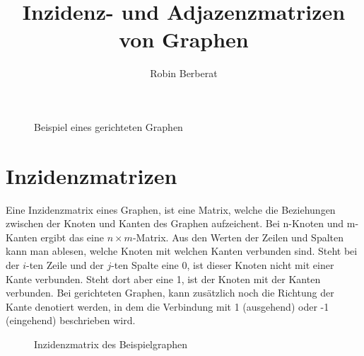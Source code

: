 \documentclass{article}
\begin{document}
    \title{Inzidenz- und Adjazenzmatrizen von Graphen}
    \author{Robin Berberat}
    \maketitle

    \begin{figure}[h]
        \centering
        \caption{Beispiel eines gerichteten Graphen}
    \end{figure}

    \newpage

    \section{Inzidenzmatrizen}
    Eine Inzidenzmatrix eines Graphen, ist eine Matrix, welche die Beziehungen zwischen der Knoten und Kanten des Graphen aufzeichent.
    Bei n-Knoten und m-Kanten ergibt das eine \(n\times m\)-Matrix.
    Aus den Werten der Zeilen und Spalten kann man ablesen, welche Knoten mit welchen Kanten verbunden sind.
    Steht bei der \(i\)-ten Zeile und der \(j\)-ten Spalte eine 0, ist dieser Knoten nicht mit einer Kante verbunden.
    Steht dort aber eine 1, ist der Knoten mit der Kanten verbunden.
    Bei gerichteten Graphen, kann zus\"atzlich noch die Richtung der Kante denotiert werden, in dem die Verbindung mit 1 (ausgehend) oder -1 (eingehend) beschrieben wird.

    \begin{figure}[h!]
        \centering
        \caption{Inzidenzmatrix des Beispielgraphen}
    \end{figure}
\end{document}
